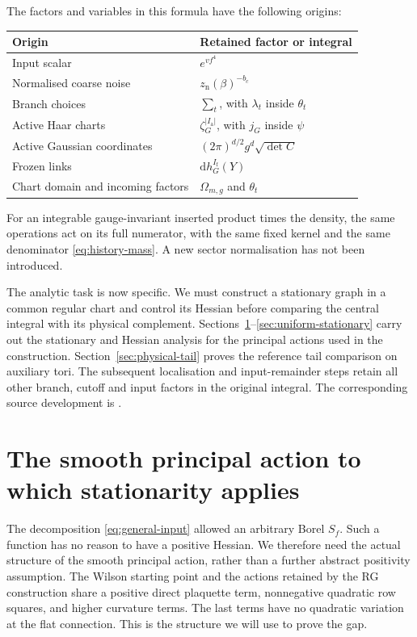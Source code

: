 \documentclass[11pt,reqno]{amsart}
\numberwithin{equation}{section}
\theoremstyle{definition}
\theoremstyle{remark}
\newcommand{\dd}{\mathrm d}
\newcommand{\Ia}{I_{\mathrm a}}
\newcommand{\If}{I_{\mathrm f}}
\begin{document}
The factors and variables in this formula have the following origins:
\begin{center}
\small
\begin{tabular}{@{}ll@{}}
\toprule
Origin & Retained factor or integral\\
\midrule
Input scalar & \(e^{vf^4}\)\\
Normalised coarse noise & \(z_{\mathrm n}(\beta)^{-b_c}\)\\
Branch choices & \(\sum_t\), with \(\lambda_t\) inside \(\theta_t\)\\
Active Haar charts & \(\zeta_G^{|\Ia|}\), with \(j_G\) inside \(\psi\)\\
Active Gaussian coordinates & \((2\pi)^{d/2}g^d\sqrt{\det C}\)\\
Frozen links & \(\dd h_G^{\If}(Y)\)\\
Chart domain and incoming factors & \(\Omega_{m,g}\) and \(\theta_t\)\\
\bottomrule
\end{tabular}
\end{center}
For an integrable gauge-invariant inserted product times the density,
the same operations act on its full numerator,
with the same fixed kernel and the same denominator
\eqref{eq:history-mass}. A new sector normalisation has not been
introduced.

The analytic task is now specific. We must construct a stationary
graph in a common regular chart and control its Hessian before
comparing the central integral with its physical complement.
Sections~\ref{sec:smooth-principal}--\ref{sec:uniform-stationary}
carry out the stationary and Hessian analysis for the principal
actions used in the construction.
Section~\ref{sec:physical-tail} proves the reference tail comparison
on auxiliary tori. The subsequent localisation and input-remainder
steps retain all other branch, cutoff and input factors in the
original integral. The corresponding source
development is \cite[Sections~14--19, pp.~55--100]{Main}.

\section{The smooth principal action to which stationarity applies}
\label{sec:smooth-principal}

The decomposition \eqref{eq:general-input} allowed an arbitrary
Borel \(S_f\). Such a function has no reason to have a positive
Hessian. We therefore need the actual structure of the smooth
principal action, rather than a further abstract positivity
assumption. The Wilson starting point and the actions retained by
the RG construction share a positive direct plaquette term,
nonnegative quadratic row squares, and higher curvature terms.
The last terms have no quadratic variation at the flat connection.
This is the structure we will use to prove the gap.
\end{document}
